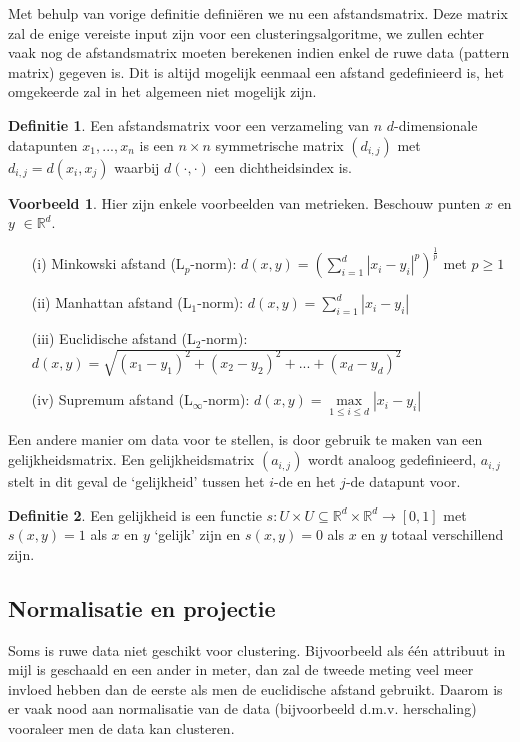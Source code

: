 \documentclass[a4paper,12pt]{article}
\theoremstyle{definition}
\newtheorem{vb}{Voorbeeld}[subsection]
\newtheorem{definition}{Definitie}[subsection]
\begin{document}
Met behulp van vorige definitie definiëren we nu een afstandsmatrix. Deze matrix
zal de enige vereiste input zijn voor een clusteringsalgoritme, we zullen echter vaak nog de afstandsmatrix
moeten berekenen indien enkel de ruwe data (pattern matrix) gegeven is. Dit is altijd mogelijk eenmaal een
afstand gedefinieerd is, het omgekeerde zal in het algemeen niet mogelijk zijn.

\begin{definition}
 Een afstandsmatrix voor een verzameling van $n$ $d$-dimensionale datapunten
 ${x_1, ..., x_n}$ is een $n\times n$ symmetrische matrix $(d_{i,j})$ met
 $d_{i,j} = d(x_i, x_j)$ waarbij $d(\cdot,\cdot)$ een dichtheids\-index is.
\end{definition}


\begin{vb}
 Hier zijn enkele voorbeelden van metrieken. Beschouw punten $x$ en $y$ $\in \mathbb{R}^d$.
 \begin{enumerate}
  \item[(i)] Minkowski afstand (L$_p$-norm): $d(x,y) = \left(\sum\limits_{i=1}^d|x_i-y_i|^p\right)^{\frac{1}{p}}$ met $p\geq1$
  \item[(ii)] Manhattan afstand (L$_1$-norm): $d(x,y) = \sum\limits_{i=1}^d|x_i-y_i|$
  \item[(iii)] Euclidische afstand  (L$_2$-norm): $d(x,y) = \sqrt{(x_1-y_1)^2 + (x_2-y_2)^2 + ... + (x_d-y_d)^2}$
  \item[(iv)] Supremum afstand  (L$_\infty$-norm): $d(x,y) = \max\limits_{1\leq i\leq d}|x_i - y_i|$
 \end{enumerate}
\end{vb}

Een andere manier om data voor te stellen, is door gebruik te maken van een gelijkheids\-matrix.
Een gelijkheidsmatrix $(a_{i,j})$ wordt analoog gedefinieerd, $a_{i,j}$ stelt in dit geval de `gelijk\-heid' tussen
het $i$-de en het $j$-de datapunt voor.

\begin{definition}
 Een gelijkheid is een functie
 $s: U \times U \subseteq \mathbb{R}^d \times \mathbb{R}^d \rightarrow [0,1]$ met 
 $s(x,y) = 1$ als $x$ en $y$ `gelijk' zijn
 en $s(x,y)=0$ als $x$ en $y$ totaal verschillend zijn. 
\end{definition}

\subsection{Normalisatie en projectie}
Soms is ruwe data niet geschikt voor clustering. Bijvoorbeeld als één attribuut
in mijl is geschaald en een ander in meter, dan zal de tweede meting veel meer
invloed hebben dan de eerste als men de euclidische afstand gebruikt. Daarom is
er vaak nood aan normalisatie van de data (bijvoorbeeld d.m.v. herschaling)
vooraleer men de data kan clusteren.
\end{document}
